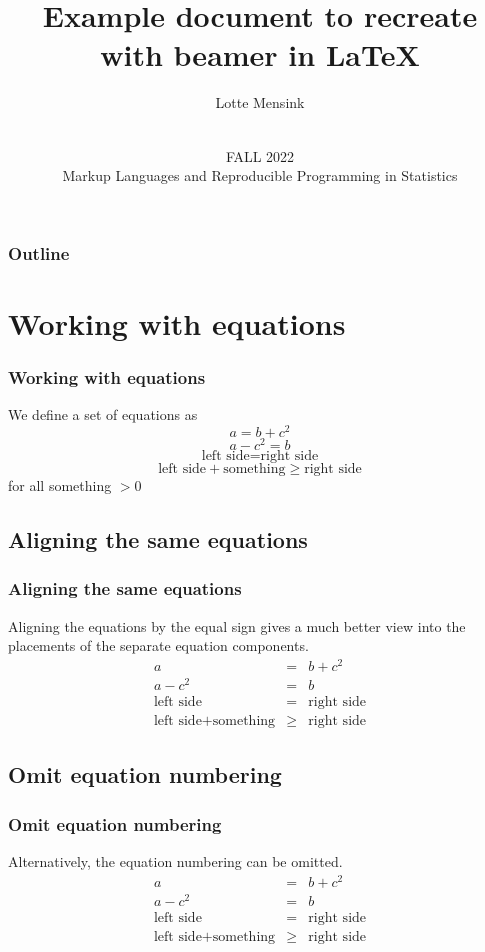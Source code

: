 \documentclass[aspectratio=169]{beamer}
\title{Example document to recreate with beamer in \LaTeX}
\author{Lotte Mensink}
\date[MLRPS]{\vspace{.5 in}\\ FALL 2022 \\ Markup Languages and Reproducible Programming in Statistics  \vskip6mm}
\begin{document}
\frame{\titlepage}

\begin{frame}
\frametitle{Outline}
\tableofcontents
\end{frame}

\section{Working with equations}
\begin{frame}
\frametitle{Working with equations}
We define a set of equations as
\begin{equation}
    a = b + c^2
\end{equation}
\begin{equation}
    a - c^2 = b 
\end{equation}
\begin{equation}
    \text{left side} = \text{right side}
\end{equation}
\begin{equation}
    \text{left side} + \text{something} \geq \text{right side}
\end{equation}
for all something $>0$
\end{frame}

\subsection{Aligning the same equations}
\begin{frame}
\frametitle{Aligning the same equations}
Aligning the equations by the equal sign gives a much better view into the placements of the separate equation components.
\begin{eqnarray}
    a &=& b + c^2 \\
    a - c^2 &=& b \\
    \text{left side} &=& \text{right side} \\
    \text{left side} + \text{something} &\geq& \text{right side}
\end{eqnarray}
\end{frame}

\subsection{Omit equation numbering}
\begin{frame}
\frametitle{Omit equation numbering}
Alternatively, the equation numbering can be omitted.
 \begin{eqnarray*}
    a &=& b + c^2 \\
    a - c^2 &=& b \\
    \text{left side} &=& \text{right side} \\
    \text{left side} + \text{something} &\geq& \text{right side}
\end{eqnarray*}   
\end{frame}
\end{document}
